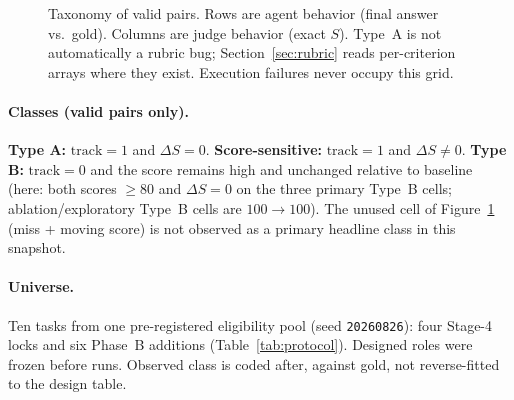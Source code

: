 \documentclass[11pt]{article}
\begin{document}
\begin{figure}[t]
\centering
{}
\caption{Taxonomy of valid pairs. Rows are agent behavior (final answer
vs.\ gold). Columns are judge behavior (exact $S$). Type~A is not
automatically a rubric bug; Section~\ref{sec:rubric} reads per-criterion
arrays where they exist. Execution failures never occupy this grid.}
\label{fig:taxonomy}
\end{figure}

\paragraph{Classes (valid pairs only).}
\textbf{Type A:} $\mathrm{track}=1$ and $\Delta S=0$.
\textbf{Score-sensitive:} $\mathrm{track}=1$ and $\Delta S\neq 0$.
\textbf{Type B:} $\mathrm{track}=0$ and the score remains high and
unchanged relative to baseline (here: both scores $\ge 80$ and
$\Delta S=0$ on the three primary Type~B cells; ablation/exploratory
Type~B cells are $100{\to}100$).
The unused cell of Figure~\ref{fig:taxonomy} (miss + moving score) is
not observed as a primary headline class in this snapshot.

\paragraph{Universe.}
Ten tasks from one pre-registered eligibility pool (seed
\texttt{20260826}): four Stage-4 locks and six Phase~B additions
(Table~\ref{tab:protocol}). Designed roles were frozen before runs.
Observed class is coded after, against gold, not reverse-fitted to the
design table.
\end{document}
